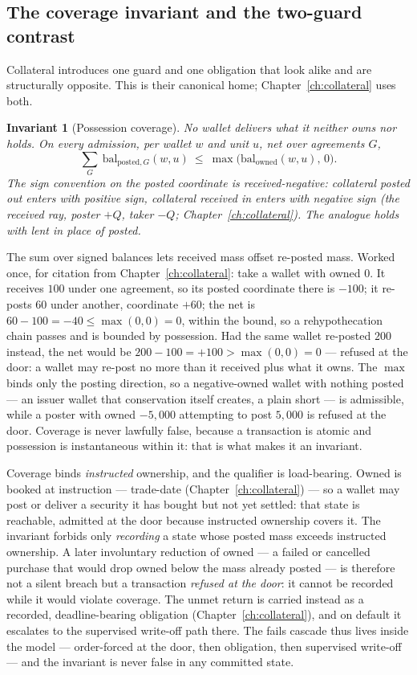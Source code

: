\documentclass[11pt,a4paper]{article}
\newtheorem{invariant}[definition]{Invariant}
\begin{document}
\subsection{The coverage invariant and the two-guard contrast}

Collateral introduces one guard and one obligation that look alike and are
structurally opposite. This is their canonical home; Chapter~\ref{ch:collateral}
uses both.

\begin{invariant}[Possession coverage]\label{inv:coverage}
No wallet delivers what it neither owns nor holds. On every admission, per wallet
$w$ and unit $u$, net over agreements $G$,
\[
\sum_{G}\ \mathrm{bal}_{\mathrm{posted},G}(w,u)\ \le\ \max\bigl(\mathrm{bal}_{\mathrm{owned}}(w,u),\,0\bigr).
\]
The sign convention on the posted coordinate is \emph{received-negative}:
collateral posted \emph{out} enters with positive sign, collateral received
\emph{in} enters with negative sign (the received ray, poster $+Q$, taker $-Q$;
Chapter~\ref{ch:collateral}). The analogue holds with lent in place of posted.
\end{invariant}

The sum over signed balances lets received mass offset re-posted mass. Worked once,
for citation from Chapter~\ref{ch:collateral}: take a wallet with owned $0$. It
receives $100$ under one agreement, so its posted coordinate there is $-100$; it
re-posts $60$ under another, coordinate $+60$; the net is $60-100=-40\le\max(0,0)=0$,
within the bound, so a rehypothecation chain passes and is bounded by possession.
Had the same wallet re-posted $200$ instead, the net would be $200-100=+100>\max(0,0)=0$
--- refused at the door: a wallet may re-post no more than it received plus what it
owns. The $\max$ binds only the posting direction, so a negative-owned
wallet with nothing posted --- an issuer wallet that conservation itself creates,
a plain short --- is admissible, while a poster with owned $-5{,}000$ attempting to
post $5{,}000$ is refused at the door. Coverage is never lawfully false, because a
transaction is atomic and possession is instantaneous within it: that is what
makes it an invariant.

Coverage binds \emph{instructed} ownership, and the qualifier is load-bearing. Owned is
booked at instruction --- trade-date (Chapter~\ref{ch:collateral}) --- so a wallet may
post or deliver a security it has bought but not yet settled: that state is reachable,
admitted at the door because instructed ownership covers it. The invariant forbids only
\emph{recording} a state whose posted mass exceeds instructed ownership. A later
involuntary reduction of owned --- a failed or cancelled purchase that would drop owned
below the mass already posted --- is therefore not a silent breach but a transaction
\emph{refused at the door}: it cannot be recorded while it would violate coverage. The
unmet return is carried instead as a recorded, deadline-bearing obligation
(Chapter~\ref{ch:collateral}), and on default it escalates to the supervised write-off
path there. The fails cascade thus lives inside the model --- order-forced at the door,
then obligation, then supervised write-off --- and the invariant is never false in any
committed state.
\end{document}
